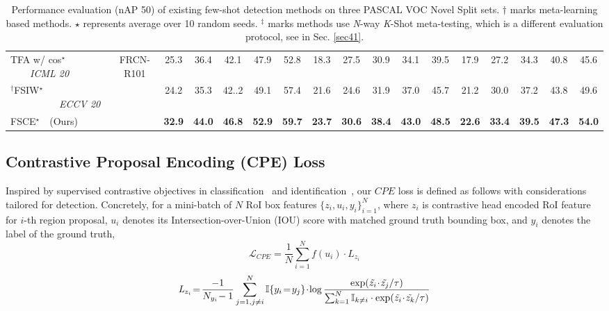 \documentclass[final]{cvpr}
\begin{document}
\begin{table*}[htbp]
\begin{center}
{\begin{tabular}{l|c|ccccc|ccccc|ccccc}
\bottomrule
\toprule
TFA w/ cos$^\star$~~~~\textit{ICML 20}~\cite{wang_frustratingly_2020} & \multirow{3}{*}{FRCN-R101} & 25.3 &  36.4 &  42.1 &  47.9 &  52.8 &  18.3 &  27.5 &  30.9 &  34.1 &  39.5 &  17.9 & 27.2 & 34.3 & 40.8 & 45.6\\
$^\dagger$FSIW$^\star$ ~~~~~~~~~~\textit{ECCV 20}~\cite{xiao_few_shot_2020} &  & 24.2 & 35.3 & 42..2 & 49.1 & 57.4 & 21.6 & 24.6 & 31.9 & 37.0 & 45.7 & 21.2 & 30.0 & 37.2 & 43.8 & 49.6\\
\rowcolor{mygray}
FSCE$^\star$~~(Ours) &  & \textbf{32.9} & \textbf{44.0} & \textbf{46.8} & \textbf{52.9} & \textbf{59.7} & \textbf{23.7} & \textbf{30.6} & \textbf{38.4} & \textbf{43.0} & \textbf{48.5} & \textbf{22.6} & \textbf{33.4} & \textbf{39.5} & \textbf{47.3} & \textbf{54.0} \\
\bottomrule
\end{tabular}}
\end{center}
\vspace{-1.7mm}
\caption{Performance evaluation (nAP 50) of existing few-shot detection methods on three PASCAL VOC Novel Split sets.
$\dagger$ marks meta-learning based methods. $\star$ represents average over 10 random seeds. $^\ddagger$ marks methods use \textit{N}-way \textit{K}-Shot meta-testing, which is a different evaluation protocol, see in Sec. \ref{sec41}.}
\label{table:voc-main}
\end{table*}



\subsection{Contrastive Proposal Encoding (CPE) Loss}\label{lossfunc}
Inspired by supervised contrastive objectives in classification~\cite{supervised_contrastive_learning} and identification~\cite{sun2014deep}, our $CPE$ loss is defined as follows with considerations tailored for detection. Concretely, for a mini-batch of $N$ RoI box features $\{z_i, u_i, y_i\}_{i=1}^{N}$, where $z_i$ is contrastive head encoded RoI feature for $i$-th region proposal, $u_i$ denotes its Intersection-over-Union (IOU) score with matched ground truth bounding box, and $y_i$ denotes the label of the ground truth,
\vspace{1mm}
\begin{equation}
\mathcal{L}_{CPE} = \frac1N\sum_{i=1}^Nf(u_i)\cdot\mathit{L}_{z_i}  \label{loss3}
\end{equation}
\begin{equation}\small
{\mathit{L}_{z_i}\! =\! \frac{-1}{N_{y_i}\!-1}\sum_{j=1,j\ne i}^{N}\mathbb{I}{\{y_i\!=\!y_j\}}\!\cdot\!\log\frac{\exp(\tilde{z_i}\!\cdot\! \tilde{z_j}/\tau)}{\sum_{k=1}^N\mathbb{I}_{k\ne i}\cdot\exp(\tilde{z_i}\!\cdot\! \tilde{z_k}/\tau)}}
    \label{loss4}
\end{equation}
\end{document}

